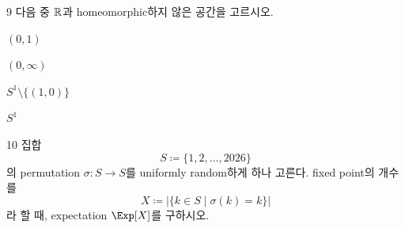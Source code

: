 \documentclass[11pt,oneside]{article}
\begin{document}
\begin{problem}{9}
다음 중 $\mathbb{R}$과 homeomorphic하지 않은 공간을 고르시오.

\begin{problemchoices}
    \item $(0,1)$
    \item $(0,\infty)$
    \item $S^1\setminus\{(1,0)\}$
    \item $S^1$
\end{problemchoices}
\end{problem}

\begin{problem}{10}
집합
\[
    S\coloneqq \{1,2,\ldots,2026\}
\]
의 permutation $\sigma\colon S\to S$를 uniformly random하게 하나 고른다. fixed point의 개수를
\[
    X
    \coloneqq
    \left|\{k\in S\mid \sigma(k)=k\}\right|
\]
라 할 때, expectation $\Exp[X]$를 구하시오.
\end{problem}
\end{document}
